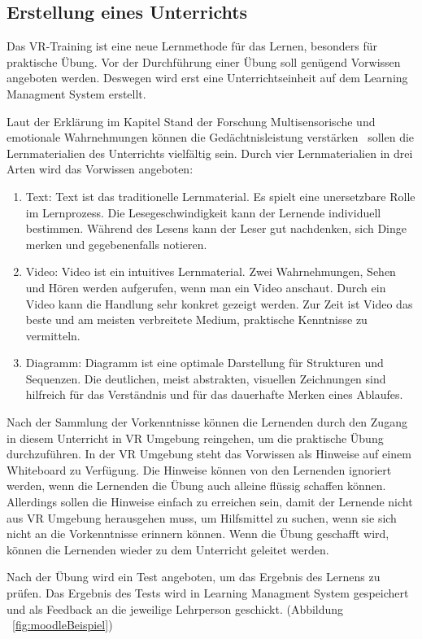  \subsection{Erstellung eines Unterrichts}
 Das VR-Training ist eine neue Lernmethode für das Lernen, besonders für praktische Übung. Vor der Durchführung einer Übung soll genügend Vorwissen angeboten werden. Deswegen wird erst eine Unterrichtseinheit auf dem Learning Managment System erstellt.

 Laut der Erklärung im Kapitel Stand der Forschung \glqq Multisensorische und emotionale Wahrnehmungen können die Gedächtnisleistung verstärken\grqq\ \citep{11} sollen die Lernmaterialien des Unterrichts vielfältig sein. Durch vier Lernmaterialien in drei Arten wird das Vorwissen angeboten:
 \begin{enumerate}
    \item Text: Text ist das traditionelle Lernmaterial. Es spielt eine unersetzbare Rolle im Lernprozess. Die Lesegeschwindigkeit kann der Lernende individuell bestimmen. Während des Lesens kann der Leser gut nachdenken, sich Dinge merken und gegebenenfalls notieren.
    \item Video: Video ist ein intuitives Lernmaterial. Zwei Wahrnehmungen, Sehen und Hören werden aufgerufen, wenn man ein Video anschaut. Durch ein Video kann die Handlung sehr konkret gezeigt werden. Zur Zeit ist Video das beste und am meisten verbreitete Medium, praktische Kenntnisse zu vermitteln.
    \item Diagramm: Diagramm ist eine optimale Darstellung für Strukturen und Sequenzen. Die deutlichen, meist abstrakten, visuellen Zeichnungen sind hilfreich für das Verständnis und für das dauerhafte Merken eines Ablaufes.
 \end{enumerate}

 Nach der Sammlung der Vorkenntnisse können die Lernenden durch den Zugang in diesem Unterricht in VR Umgebung reingehen, um die praktische Übung durchzuführen. In der VR Umgebung steht das Vorwissen als Hinweise auf einem Whiteboard zu Verfügung. Die Hinweise können von den Lernenden ignoriert werden, wenn die Lernenden die Übung auch alleine flüssig schaffen können. Allerdings sollen die Hinweise einfach zu erreichen sein, damit der Lernende nicht aus VR Umgebung herausgehen muss, um Hilfsmittel zu suchen, wenn sie sich nicht an die Vorkenntnisse erinnern können. Wenn die Übung geschafft wird, können die Lernenden wieder zu dem Unterricht geleitet werden.

 Nach der Übung wird ein Test angeboten, um das Ergebnis des Lernens zu prüfen. Das Ergebnis des Tests wird in Learning Managment System gespeichert und als Feedback an die jeweilige Lehrperson geschickt. (Abbildung ~\ref{fig:moodleBeispiel})
 
